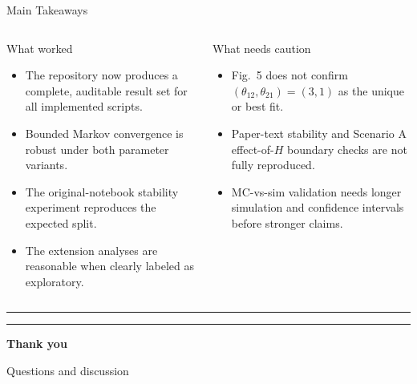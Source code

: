\documentclass[aspectratio=169,10pt]{beamer}
\newcommand{\tightitems}{\setlength{\itemsep}{0.25em}\setlength{\parskip}{0pt}\setlength{\parsep}{0pt}}
\begin{document}
\begin{frame}[t]{Main Takeaways}
\footnotesize
\begin{columns}[T,onlytextwidth]
\begin{block}{What worked}
\begin{itemize}
  \tightitems
  \item The repository now produces a complete, auditable result set for all implemented scripts.
  \item Bounded Markov convergence is robust under both parameter variants.
  \item The original-notebook stability experiment reproduces the expected split.
  \item The extension analyses are reasonable when clearly labeled as exploratory.
\end{itemize}
\end{block}

\begin{block}{What needs caution}
\begin{itemize}
  \tightitems
  \item Fig.\ 5 does not confirm $(\theta_{12},\theta_{21})=(3,1)$ as the unique or best fit.
  \item Paper-text stability and Scenario A effect-of-$H$ boundary checks are not fully reproduced.
  \item MC-vs-sim validation needs longer simulation and confidence intervals before stronger claims.
\end{itemize}
\end{block}
\end{columns}
\end{frame}

\begin{frame}[plain]
\vspace*{1.4cm}
{\color{accent}\rule{0.18\textwidth}{1.4pt}\hspace{0.45em}%
 \color{accenttwo}\rule{0.06\textwidth}{1.4pt}}\par
\vspace{0.75cm}
{\Huge\textbf{Thank you}}\par
\vspace{0.45cm}
{\large\textcolor{muted}{Questions and discussion}}
\end{frame}
\end{document}
